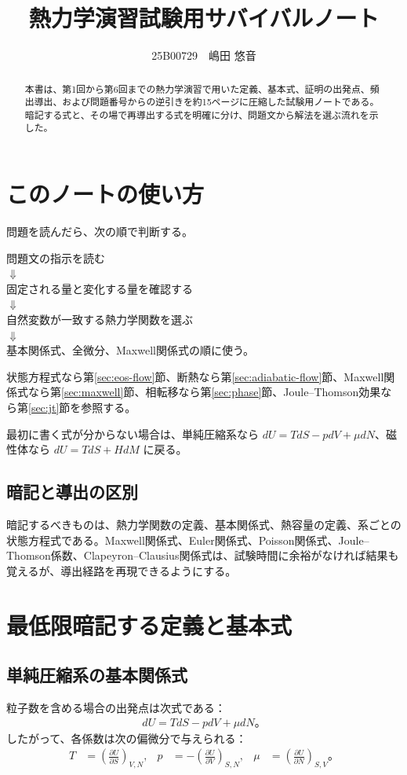 \documentclass[platex,dvipdfmx,a4paper,10pt]{jsarticle}
\title{熱力学演習試験用サバイバルノート}
\author{25B00729　嶋田 悠音}
\newcommand{\key}[1]{\begin{framed}\noindent #1\end{framed}}
\newcommand{\flow}[1]{\begin{center}\begin{minipage}{0.94\textwidth}\centering #1\end{minipage}\end{center}}
\begin{document}
\maketitle
\begin{abstract}
本書は、第1回から第6回までの熱力学演習で用いた定義、基本式、証明の出発点、頻出導出、および問題番号からの逆引きを約15ページに圧縮した試験用ノートである。暗記する式と、その場で再導出する式を明確に分け、問題文から解法を選ぶ流れを示した。
\end{abstract}
\tableofcontents
\newpage

\section{このノートの使い方}\label{sec:usage}
問題を読んだら、次の順で判断する。
\flow{問題文の指示を読む\\$\Downarrow$\\固定される量と変化する量を確認する\\$\Downarrow$\\自然変数が一致する熱力学関数を選ぶ\\$\Downarrow$\\基本関係式、全微分、Maxwell関係式の順に使う。}
状態方程式なら第\ref{sec:eos-flow}節、断熱なら第\ref{sec:adiabatic-flow}節、Maxwell関係式なら第\ref{sec:maxwell}節、相転移なら第\ref{sec:phase}節、Joule--Thomson効果なら第\ref{sec:jt}節を参照する。

\key{最初に書く式が分からない場合は、単純圧縮系なら $dU=TdS-pdV+\mu dN$、磁性体なら $dU=TdS+HdM$ に戻る。}

\subsection{暗記と導出の区別}
暗記するべきものは、熱力学関数の定義、基本関係式、熱容量の定義、系ごとの状態方程式である。Maxwell関係式、Euler関係式、Poisson関係式、Joule--Thomson係数、Clapeyron--Clausius関係式は、試験時間に余裕がなければ結果も覚えるが、導出経路を再現できるようにする。

\newpage
\section{最低限暗記する定義と基本式}\label{sec:memorize}
\subsection{単純圧縮系の基本関係式}
粒子数を含める場合の出発点は次式である：
\begin{align}
  dU=TdS-pdV+\mu dN。\label{eq:fundamental}
\end{align}
したがって、各係数は次の偏微分で与えられる：
\begin{align}
  T&=\left(\frac{\partial U}{\partial S}\right)_{V,N}, &
  p&=-\left(\frac{\partial U}{\partial V}\right)_{S,N}, &
  \mu&=\left(\frac{\partial U}{\partial N}\right)_{S,V}。\label{eq:conjugates}
\end{align}
\end{document}
